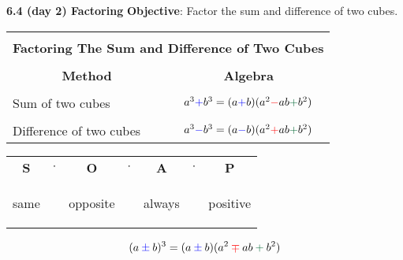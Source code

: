 \documentclass{report}
\theoremstyle{definition}
\begin{document}
\vfill
 \noindent{}
 \newpage

\noindent\Large{\textbf{6.4 (day 2) Factoring}} 
\indent\hfill\small\noindent \textbf{Objective}: Factor the sum and difference of two cubes.  \normalsize\\


 \begin{center}
	\begin{tabular}{|l|c|}
		\hline
		\multicolumn{2}{|c|}{}\\
		\multicolumn{2}{|c|}{\large\textbf{Factoring The Sum and Difference of Two Cubes}\normalsize}\\ 
		\hline
		&\\
		\multicolumn{1}{|c|}{\textbf{Method}} & \multicolumn{1}{c|}{\textbf{Algebra}}\\
		\hline
		&\\
		Sum of two cubes& $a^3\color{blue} \mathbf{+} \color{black} b^3=(a\color{blue} \mathbf{ + } \color{black}b)(a^2\color{red}\mathbf{ - }\color{black}ab\color{darkgreen} \mathbf{+} \color{black}b^2)$\\
		\hline
		&\\
		Difference of two cubes& $a^3\color{blue}\mathbf{ - }\color{black}b^3=(a\color{blue}\mathbf{ - }\color{black}b)(a^2\color{red}\mathbf{ + }\color{black}ab\color{darkgreen} \mathbf{+} \color{black}b^2)$\\
		\hline
	\end{tabular}
\end{center}

\Large
\begin{center}
\begin{tabular}{ccccccc}
\textbf{\color{blue}S\color{black}} &  $\cdot$  &   \textbf{\color{red}O\color{black}}  &   $\cdot$  &   \textbf{\color{darkgreen}A\color{black}}  &   $\cdot$  &  \textbf{ \color{darkgreen}P\color{black}}\\
\begin{turn}{-90}\color{blue}same\color{black}\end{turn} && \begin{turn}{-90}\color{red}opposite\color{black}\end{turn} && \begin{turn}{-90}\color{darkgreen}always\color{black}\end{turn} && \begin{turn}{-90}\color{darkgreen}positive\color{black}\end{turn}

\end{tabular}

\[(a \color{blue}\pm\color{black} b)^3 = (a\color{blue}\pm\color{black}b)(a^2 \color{red}\mp \color{black} ab \color{darkgreen}+\color{black} b^2)\]
\end{center}
\normalsize
\end{document}
